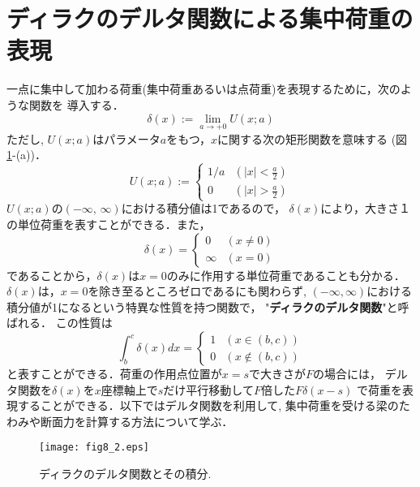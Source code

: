 \documentclass[10pt,a4j]{jbook}
\begin{document}
\section{ディラクのデルタ関数による集中荷重の表現}
一点に集中して加わる荷重(集中荷重あるいは点荷重)を表現するために，次のような関数を
導入する．
\begin{equation}
	\delta  (x) := \lim _ {a\rightarrow +0} U(x;a)
	\label{eqn:delta_x}
\end{equation}
ただし, $U(x;a)$はパラメータ$a$をもつ，$x$に関する次の矩形関数を意味する
(図\ref{fig:fig8_2}-(a))．
\begin{equation}
	U(x;a):=\left\{
		\begin{array}{cc}
			1/a & \left(\left| x \right| < \frac{a}{2} \right) \\
			0 & \left(\left| x \right| > \frac{a}{2} \right) 
		\end{array}
		\right.
	\label{eqn:def_U}
\end{equation}
$U(x;a)$の$(-\infty,\,\infty)$における積分値は1であるので，
$\delta(x)$により，大きさ１の単位荷重を表すことができる．また，
\begin{equation}
	\delta(x)=\left\{
		\begin{array}{cc}
			0 & \left(x\neq 0\right) \\
			\infty & \left(x=0 \right) 
		\end{array}
		\right.
	\label{eqn:delta_x_val}
\end{equation}
であることから，$\delta(x)$は$x=0$のみに作用する単位荷重であることも分かる．
$\delta(x)$は，$x=0$を除き至るところゼロであるにも関わらず, 
$(-\infty,\infty)$における積分値が1になるという特異な性質を持つ関数で，
"{\bf ディラクのデルタ関数}"と呼ばれる．
この性質は
\begin{equation}
	\int _b^c \delta(x) dx = \left\{
	\begin{array}{cc}
		1 & \left( x \in (b,c)\right) \\ 
		0 & \left( x \notin (b,c)\right)
	\end{array}
	\label{eqn:idelta_ab}
	\right.
\end{equation}
と表すことができる．荷重の作用点位置が$x=s$で大きさが$F$の場合には，
デルタ関数を$\delta(x)$を$x$座標軸上で$s$だけ平行移動して$F$倍した$F\delta (x-s)$
で荷重を表現することができる．以下ではデルタ関数を利用して, 集中荷重を受ける梁のたわみや断面力を計算する方法について学ぶ．
\begin{figure}
	\begin{center}
	\texttt{[image: fig8\_2.eps]} 
	\end{center}
	\caption{
		ディラクのデルタ関数とその積分.
	 } 
	\label{fig:fig8_2}
\end{figure}
\end{document}
